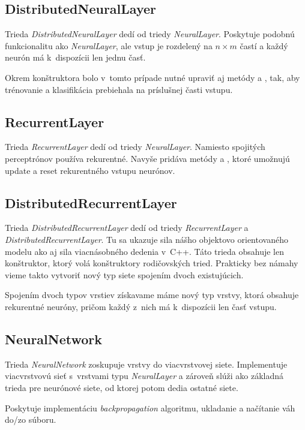 \subsection{DistributedNeuralLayer}
Trieda \textit{DistributedNeuralLayer} dedí od triedy \textit{NeuralLayer}. Poskytuje podobnú funkcionalitu ako \textit{NeuralLayer}, ale vstup je rozdelený na $n\times m$ častí a každý neurón má k~dispozícii len jednu časť. 

Okrem konštruktora bolo v~tomto prípade nutné upraviť aj metódy  a , tak, aby trénovanie a klasifikácia prebiehala na príslušnej časti vstupu.

\subsection{RecurrentLayer}
Trieda \textit{RecurrentLayer} dedí od triedy \textit{NeuralLayer}. Namiesto spojitých perceptrónov používa rekurentné. Navyše pridáva metódy  a , ktoré umožnujú update a reset rekurentného vstupu neurónov.

\subsection{DistributedRecurrentLayer}
Trieda \textit{DistributedRecurrentLayer} dedí od triedy \textit{RecurrentLayer} a \textit{DistributedRecurrentLayer}. Tu sa ukazuje sila nášho objektovo orientovaného modelu ako aj sila viacnásobného dedenia v~C++. Táto trieda obsahuje len konštruktor, ktorý volá konštruktory rodičovských tried. Prakticky bez námahy vieme takto vytvoriť nový typ siete spojením dvoch existujúcich.

Spojením dvoch typov vrstiev získavame máme nový typ vrstvy, ktorá obsahuje rekurentné neuróny, pričom každý z~nich má k~dispozícii len časť vstupu.

\subsection{NeuralNetwork}
Trieda \textit{NeuralNetwork} zoskupuje vrstvy do viacvrstvovej siete. Implementuje viacvrstvovú sieť s~vrstvami typu \textit{NeuralLayer} a zároveň slúži ako základná trieda pre neurónové siete, od ktorej potom dedia ostatné siete.

Poskytuje implementáciu \textit{backpropagation} algoritmu, ukladanie a načítanie váh do/zo súboru.

